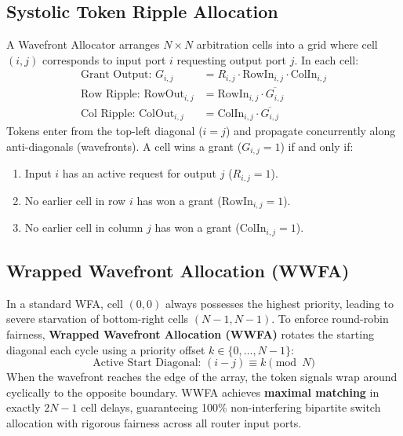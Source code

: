 \subsection{Systolic Token Ripple Allocation}
\label{subsec:ch3_wfa_array}

A Wavefront Allocator arranges $N \times N$ arbitration cells into a grid where cell $(i, j)$ corresponds to input port $i$ requesting output port $j$. In each cell:
\begin{align}
\text{Grant Output: } G_{i, j} &= R_{i, j} \cdot \text{RowIn}_{i, j} \cdot \text{ColIn}_{i, j} \label{eq:ch3_wfa_grant} \\
\text{Row Ripple: } \text{RowOut}_{i, j} &= \text{RowIn}_{i, j} \cdot \overline{G_{i, j}} \label{eq:ch3_wfa_row} \\
\text{Col Ripple: } \text{ColOut}_{i, j} &= \text{ColIn}_{i, j} \cdot \overline{G_{i, j}} \label{eq:ch3_wfa_col}
\end{align}
Tokens enter from the top-left diagonal ($i = j$) and propagate concurrently along anti-diagonals (wavefronts). A cell wins a grant ($G_{i, j} = 1$) if and only if:
\begin{enumerate}
    \item Input $i$ has an active request for output $j$ ($R_{i, j} = 1$).
    \item No earlier cell in row $i$ has won a grant ($\text{RowIn}_{i, j} = 1$).
    \item No earlier cell in column $j$ has won a grant ($\text{ColIn}_{i, j} = 1$).
\end{enumerate}

\subsection{Wrapped Wavefront Allocation (WWFA)}
\label{subsec:ch3_wwfa}

In a standard WFA, cell $(0, 0)$ always possesses the highest priority, leading to severe starvation of bottom-right cells $(N-1, N-1)$. To enforce round-robin fairness, \textbf{Wrapped Wavefront Allocation (WWFA)} rotates the starting diagonal each cycle using a priority offset $k \in \{0, \dots, N-1\}$:
\begin{equation}
\text{Active Start Diagonal: } (i - j) \equiv k \pmod N
\label{eq:ch3_wwfa_rotation}
\end{equation}
When the wavefront reaches the edge of the array, the token signals wrap around cyclically to the opposite boundary. WWFA achieves \textbf{maximal matching} in exactly $2N - 1$ cell delays, guaranteeing 100\% non-interfering bipartite switch allocation with rigorous fairness across all router input ports.


